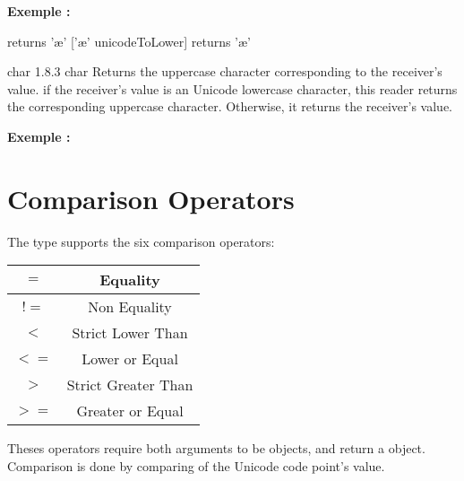 \textbf{Exemple :}
\begin{galgascode}
['\AE' unicodeToLower] returns '\ae '
['\ae' unicodeToLower] returns '\ae '
\end{galgascode}




{char}
{1.8.3}
{char}
{Returns the uppercase character corresponding to the receiver's value.}
{if the receiver's value is an Unicode lowercase character, this reader returns the corresponding uppercase character. Otherwise, it returns the receiver's value.}

\textbf{Exemple :}
\begin{galgascode}
['\AE' unicodeToUpper] returns '\AE'}
['\ae' unicodeToUpper] returns '\AE'}
\end{galgascode}





\section{Comparison Operators}

The  type supports the six comparison operators:\newline

\begin{tabular}{|c|c|}
\hline
$=$ & Equality \\
\hline
$!=$ & Non Equality \\
\hline
$<$  & Strict Lower Than \\
\hline
$<=$  & Lower or Equal \\
\hline
$>$  & Strict Greater Than \\
\hline
$>=$  & Greater or Equal \\
\hline
\end{tabular}

Theses operators require both arguments to be  objects, and return a  object. Comparison is done by comparing of the Unicode code point's value.


